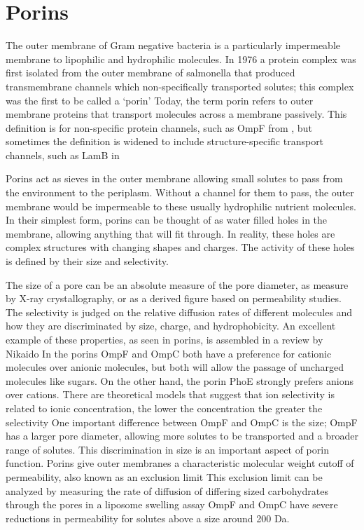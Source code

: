   \section{Porins} \label{sec:intro-porins}
 
The outer membrane of Gram negative bacteria is a particularly impermeable membrane to lipophilic and hydrophilic molecules. In 1976 a protein complex was first isolated from the
outer membrane of \ac{salmonella} that produced transmembrane channels which non-specifically transported solutes; this complex was the first to be called a
`porin' Today, the term porin refers to outer membrane proteins that transport molecules across a membrane passively. This definition is for non-specific
protein channels, such as OmpF from \ecoli{}, but sometimes the definition is widened to include structure-specific transport channels, such as LamB
in \ecoli{}

Porins act as sieves in the outer membrane allowing small solutes to pass from the environment to the periplasm. Without a channel for them to pass, the outer membrane would be
impermeable to these usually hydrophilic nutrient molecules. In their simplest form, porins can be thought of as water filled holes in the membrane, allowing anything that will fit
through. In reality, these holes are complex structures with changing shapes and charges. The activity of these holes is defined by their size and selectivity.

The size of a pore can be an absolute measure of the pore diameter, as measure by X-ray crystallography, or as a derived figure based on permeability studies. The selectivity is
judged on the relative diffusion rates of different molecules and how they are discriminated by size, charge, and hydrophobicity. An excellent example of these properties, as seen
in \ecoli{} porins, is assembled in a review by Nikaido In \ecoli{} the porins OmpF and OmpC both have a preference for cationic molecules over
anionic molecules, but both will allow the passage of uncharged molecules like sugars. On the other hand, the \ecoli{} porin PhoE strongly prefers anions over cations. There are
theoretical models that suggest that ion selectivity is related to ionic concentration, the lower the concentration the greater the selectivity One important
difference between OmpF and OmpC is the size; OmpF has a larger pore diameter, allowing more solutes to be transported and a broader range of solutes. This discrimination in size
is an important aspect of porin function. Porins give outer membranes a characteristic molecular weight cutoff of permeability, also known as an exclusion
limit This exclusion limit can be analyzed by measuring the rate of diffusion of differing sized carbohydrates through the pores in a liposome swelling
assay OmpF and OmpC have severe reductions in permeability for solutes above a size around 200 Da.
 
